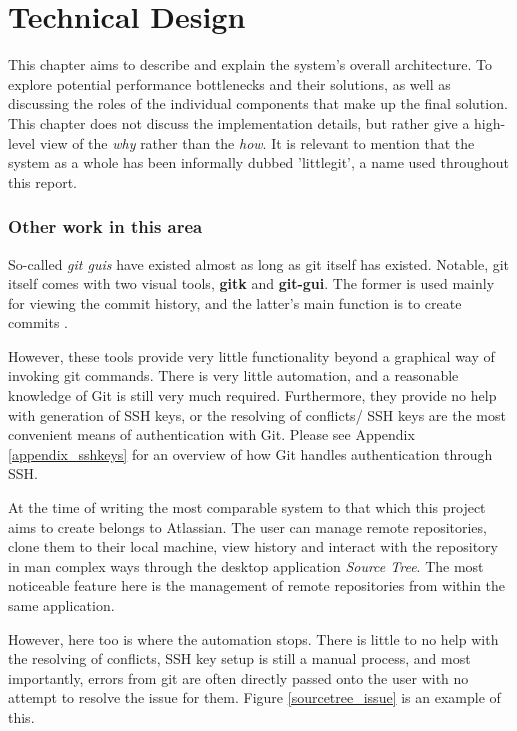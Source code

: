\chapter{Technical Design}

This chapter aims to describe and explain the system's overall architecture. To explore potential performance bottlenecks and their solutions, as well as discussing the roles of the individual components that make up the final solution. This chapter does not discuss the implementation details, but rather give a high-level view of the \emph{why} rather than the \emph{how}. It is relevant to mention that the system as a whole has been informally dubbed 'littlegit', a name used throughout this report.

\subsection{Other work in this area}

So-called \emph{git guis} have existed almost as long as git itself has existed. Notable, git itself comes with two visual tools, \textbf{gitk} and \textbf{git-gui}. The former is used mainly for viewing the commit history, and the latter's main function is to create commits \cite{gitguis}.

However, these tools provide very little functionality beyond a graphical way of invoking git commands. There is very little automation, and a reasonable knowledge of Git is still very much required. Furthermore, they provide no help with generation of SSH keys, or the resolving of conflicts/ SSH keys are the most convenient means of authentication with Git. Please see Appendix \ref{appendix_sshkeys} for an overview of how Git handles authentication through SSH.

At the time of writing the most comparable system to that which this project aims to create belongs to Atlassian. The user can manage remote repositories, clone them to their local machine, view history and interact with the repository in man complex ways through the desktop application \emph{Source Tree}. The most noticeable feature here is the management of remote repositories from within the same application. 

However, here too is where the automation stops. There is little to no help with the resolving of conflicts, SSH key setup is still a manual process, and most importantly, errors from git are often directly passed onto the user with no attempt to resolve the issue for them. Figure \ref{sourcetree_issue} is an example of this.

